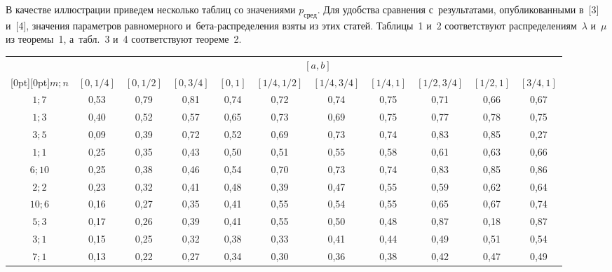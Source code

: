 \begin{multicols}{2}
\smallskip

В качестве иллюстрации приведем несколько таблиц со значениями
$p_{\mathrm{сред}}$. Для удобства сравнения с~результатами, опубликованными
в~[3] и~[4],  значения параметров равномерного и~бе\-та-рас\-пре\-де\-ле\-ния
взяты из этих статей. Таблицы~1 и~2 соответствуют распределениям~$\lambda$
и~$\mu$ из теоремы~1, а~табл.~3 и~4 соответствуют теореме~2.

\end{multicols}

\begin{table}\small %
\begin{center}
\vspace*{2ex}

\begin{tabular}{|c|c|c|c|c|c|c|c|c|c|c|}
 \hline
 &\multicolumn{10}{c|}{$[a,b]$}\\
 \cline{2-11}
 \multicolumn{1}{|c|}{\raisebox{6pt}[0pt][0pt]{$m;n$ }}&
  $[0,1/4]$ & $[0,1/2]$ & $[0,3/4]$ &
  $[0,1]$ & $[1/4,1/2]$ & $[1/4,3/4]$ &
  $[1/4,1]$ & $[1/2,3/4]$ & $[1/2,1]$ & $[3/4,1]$\\
 \hline
${1; 7}$&0,53&0,79&0,81&0,74&0,72&0,74&0,75&0,71&0,66&0,67\\
${1; 3}$&0,40&0,52&0,57&0,65&0,73&0,69&0,75&0,77&0,78&0,75\\
${3; 5}$&0,09&0,39&0,72&0,52&0,69&0,73&0,74&0,83&0,85&0,27\\
${1; 1}$&0,25&0,35&0,43&0,50&0,51&0,55&0,58&0,61&0,63&0,66\\
${6; 10}$&0,25&0,38&0,46&0,54&0,70&0,73&0,74&0,83&0,85&0,86\\
${2; 2}$&0,23&0,32&0,41&0,48&0,39&0,47&0,55&0,59&0,62&0,64\\
${10; 6}$&0,16&0,27&0,35&0,41&0,55&0,54&0,55&0,65&0,67&0,74\\
${5; 3}$&0,17&0,26&0,39&0,41&0,55&0,50&0,48&0,87&0,18&0,87\\
${3; 1}$&0,15&0,25&0,32&0,38&0,33&0,41&0,44&0,49&0,51&0,54\\
${7; 1}$&0,13&0,22&0,27&0,34&0,30&0,36&0,38&0,42&0,47&0,49\\
 \hline
 \end{tabular}
 \end{center}
\begin{center}
\vspace*{2ex}


\end{center}
\end{table}
